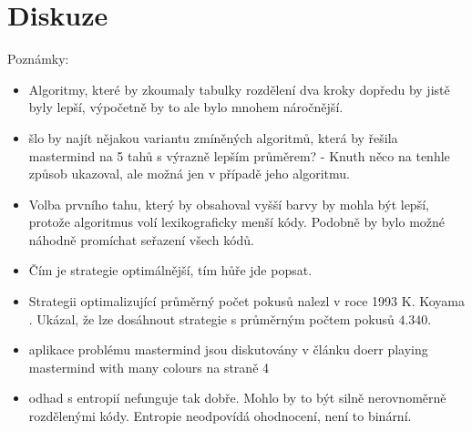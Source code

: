 \section{Diskuze}
Poznámky:

\begin{itemize}
    \item Algoritmy, které by zkoumaly tabulky rozdělení dva kroky dopředu by jistě byly lepší, výpočetně by to ale bylo mnohem náročnější.
    \item šlo by najít nějakou variantu zmíněných algoritmů, která by řešila mastermind na 5 tahů s výrazně lepším průměrem? - Knuth něco na tenhle způsob ukazoval, ale možná jen v případě jeho algoritmu.
    \item Volba prvního tahu, který by obsahoval vyšší barvy by mohla být lepší, protože algoritmus volí lexikograficky menší kódy. Podobně by bylo možné náhodně promíchat seřazení všech kódů. 
    \item Čím je strategie optimálnější, tím hůře jde popsat.
    \item Strategii optimalizující průměrný počet pokusů nalezl v roce 1993 K. Koyama \cite{koyama}. Ukázal, že lze dosáhnout strategie s průměrným počtem pokusů $4.340$.
    \item aplikace problému mastermind jsou diskutovány v článku doerr playing mastermind with many colours na straně 4
    \item odhad s entropií nefunguje tak dobře. Mohlo by to být silně nerovnoměrně rozdělenými kódy. Entropie neodpovídá ohodnocení, není to binární.

\end{itemize}




